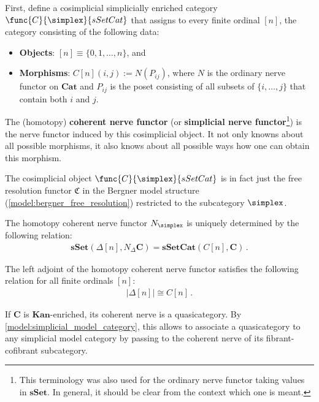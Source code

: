     First, define a cosimplicial simplicially enriched category $\func{C}{\simplex}{sSetCat}$ that assigns to every finite ordinal $[n]$, the category consisting of the following data:
    \begin{itemize}
        \item\textbf{Objects}: $[n]\equiv\{0,1,\ldots,n\}$, and
        \item\textbf{Morphisms}: $C[n](i,j) := N(P_{ij})$, where $N$ is the ordinary nerve functor on $\mathbf{Cat}$ and $P_{ij}$ is the poset consisting of all subsets of $\{i,\ldots,j\}$ that contain both $i$ and $j$.
    \end{itemize}
    The (homotopy) \textbf{coherent nerve functor} (or \textbf{simplicial nerve functor}\footnote{This terminology was also used for the ordinary nerve functor taking values in $\mathbf{sSet}$. In general, it should be clear from the context which one is meant.}) is the nerve functor induced by this cosimplicial object. It not only knowns about all possible morphisms, it also knows about all possible ways how one can obtain this morphism.
    \begin{remark}
        The cosimplicial object $\func{C}{\simplex}{sSetCat}$ is in fact just the free resolution functor $\mathfrak{C}$ in the Bergner model structure (\cref{model:bergner_free_resolution}) restricted to the subcategory $\simplex$.
    \end{remark}

    \begin{property}
        The homotopy coherent nerve functor $N_{\simplex}$ is uniquely determined by the following relation:
        \begin{gather}
            \mathbf{sSet}(\Delta[n],N_\Delta\mathbf{C})=\mathbf{sSetCat}(C[n],\mathbf{C})\,.
        \end{gather}
    \end{property}

    \begin{property}
        The left adjoint of the homotopy coherent nerve functor satisfies the following relation for all finite ordinals $[n]$:
        \begin{gather}
            |\Delta[n]|\cong C[n]\,.
        \end{gather}
    \end{property}

    \begin{property}[Quasicategories]
        If $\mathbf{C}$ is $\mathbf{Kan}$-enriched, its coherent nerve is a quasicategory. By \cref{model:simplicial_model_category}, this allows to associate a quasicategory to any simplicial model category by passing to the coherent nerve of its fibrant-cofibrant subcategory.
    \end{property}

